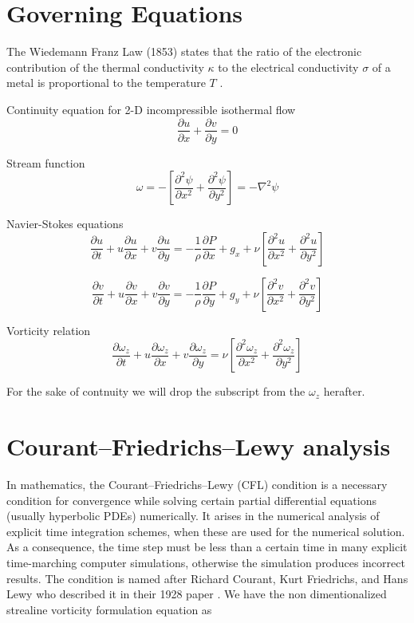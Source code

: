\documentclass{article}
\begin{document}
\section{Governing Equations}
The Wiedemann Franz Law (1853) states that the ratio of the electronic contribution of the thermal conductivity $\kappa$ to the electrical conductivity $\sigma$ of a metal is proportional to the temperature $ T $ . \citep{Ashcroft}

Continuity equation for 2-D incompressible isothermal flow
\begin{equation}
\label{eqn:continuityEqn}
\frac{\partial u}{\partial x} + \frac{\partial v}{\partial y} = 0  
\end{equation}

Stream function 
\begin{equation}
\label{eqn:streamFnEqn}
\omega = -\left[\frac{\partial^2 \psi}{\partial x^2} +  \frac{\partial^2 \psi}{\partial y^2}\right]=-\nabla^2 \psi
\end{equation}

Navier-Stokes equations
\begin{equation}
\frac{\partial u}{\partial t} + u\frac{\partial u}{\partial x} + v\frac{\partial u}{\partial y}= -\frac{1}{\rho}\frac{\partial P}{\partial x} + g_x + \nu \left [ \frac{\partial^2 u}{\partial x^2} +  \frac{\partial^2 u}{\partial y^2} \right ]
\end{equation}

\begin{equation}
\frac{\partial v}{\partial t} + u\frac{\partial v}{\partial x} + v\frac{\partial v}{\partial y}= -\frac{1}{\rho}\frac{\partial P}{\partial y} + g_y + \nu \left [ \frac{\partial^2 v}{\partial x^2} +  \frac{\partial^2 v}{\partial y^2} \right ]
\end{equation}

Vorticity relation 
\begin{equation}
\label{eqn:vorticityFnEqn}
\frac{\partial \omega_z}{\partial t} + u\frac{\partial \omega_z}{\partial x} + v\frac{\partial \omega_z}{\partial y}= \nu \left [ \frac{\partial^2 \omega_z}{\partial x^2} +  \frac{\partial^2 \omega_z}{\partial y^2} \right ]
\end{equation}

For the sake of contnuity we will drop the subscript from the $\omega_z$ herafter.

\section{Courant–Friedrichs–Lewy analysis}
In mathematics, the Courant–Friedrichs–Lewy (CFL) condition is a necessary condition for convergence while solving certain partial differential equations (usually hyperbolic PDEs) numerically. It arises in the numerical analysis of explicit time integration schemes, when these are used for the numerical solution. As a consequence, the time step must be less than a certain time in many explicit time-marching computer simulations, otherwise the simulation produces incorrect results. The condition is named after Richard Courant, Kurt Friedrichs, and Hans Lewy who described it in their 1928 paper \citep{cfl}.
We have the non dimentionalized strealine vorticity formulation equation as
\end{document}

